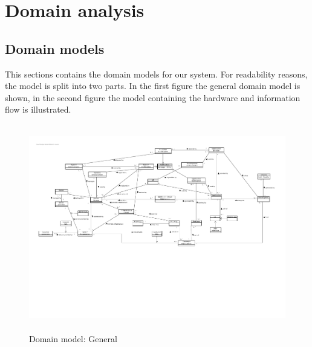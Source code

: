 
\usepackage[colorlinks, linkcolor=black, citecolor=black, urlcolor=black]{hyperref}
\usepackage{float}







\maketitle

\tableofcontents

\chapter{Domain analysis}\label{sec:domain}
\section{Domain models}
This sections contains the domain models for our system. For readability reasons, the model is split into two parts. In the first figure the general domain model is shown, in the second figure the model containing the hardware and information flow is illustrated.

\begin{figure}[H]
    \centering
    \includegraphics[width=\textwidth, height=9cm, angle=90]{Domain_model.pdf}
    \caption{Domain model: General}\label{fig:domain_model1}
\end{figure}

